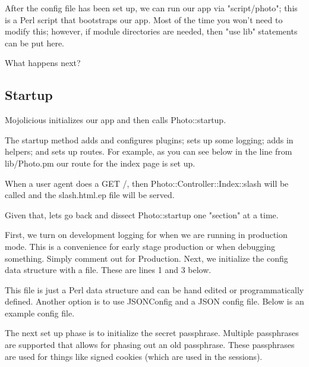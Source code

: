 \documentclass[14pt]{extreport}
\begin{document}
After the config file has been set up, we can run our app via "script/photo";
this is a Perl script that bootstraps our app.  Most of the time you won't need
to modify this; however, if module directories are needed, then "use lib" statements
can be put here.

What happens next?

\subsection{Startup}

Mojolicious initializes our app and then calls Photo::startup.

The startup method adds and configures plugins; sets up some logging; adds in
helpers; and sets up routes.  For example, as you can see below in the line
from lib/Photo.pm our route for the index page is set up.



When a user agent does a GET /, then Photo::Controller::Index::slash will be
called and the slash.html.ep file will be served.

Given that, lets go back and dissect Photo::startup one "section" at a time.

First, we turn on development logging for when we are running in production
mode.  This is a convenience for early stage production or when debugging
something.  Simply comment out for Production.  Next, we initialize the
config data structure with a file.  These are lines 1 and 3 below.



This file is just a Perl data structure and can be hand edited or
programmatically defined.  Another option is to use JSONConfig and a JSON
config file.  Below is an example config file.



The next set up phase is to initialize the secret passphrase.  Multiple
passphrases are supported that allows for phasing out an old passphrase.  These
passphrases are used for things like signed cookies (which are used in the
sessions).


\end{document}
